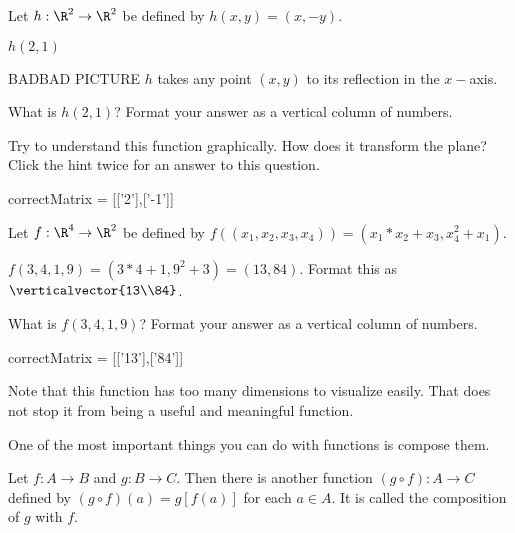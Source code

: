 \begin{question}
Let $h:\R^2 \to \R^2$ be defined by $h(x,y) = (x,-y)$.
\begin{solution}
		\begin{hint}
			$h(2,1)$
		\end{hint}
		\begin{hint}
			BADBAD PICTURE
			$h$ takes any point $(x,y)$ to its reflection in the $x-$axis.
		\end{hint}
		What is $h(2,1)$?  Format your answer as a vertical column of numbers.
		
		Try to understand this function graphically.  How does it transform the plane?  Click the hint twice for an answer to this question.
		\begin{matrix-answer}
		correctMatrix = [['2'],['-1']]
		\end{matrix-answer}
	\end{solution}

\end{question}

\begin{question}
Let $f:\R^4 \to \R^2$ be defined by $f((x_1,x_2,x_3,x_4)) = (x_1*x_2+x_3,x_4^2+x_1)$.
\begin{solution}
\begin{hint}
	$f(3,4,1,9) = (3*4+1,9^2+3) = (13,84)$.  Format this as $\verticalvector{13\\84}$.
\end{hint}
What is $f(3,4,1,9)$? Format your answer as a vertical column of numbers.
\begin{matrix-answer}
	correctMatrix = [['13'],['84']]
\end{matrix-answer}
\end{solution}

Note that this function has too many dimensions to visualize easily.  That does not stop it from being a useful and meaningful function.
\end{question}

One of the most important things you can do with functions is compose them.

\begin{definition}
	Let $f:A \to B$ and $g:B \to C$.  Then there is another function $(g \circ f): A \to C$ defined by $(g \circ f)(a) = g\left[f(a)\right]$ for each $a \in A$.
	It is called the composition of $g$ with $f$.
\end{definition}

